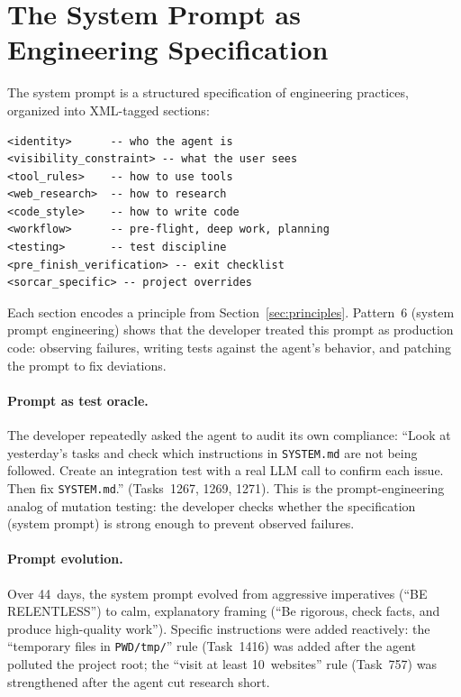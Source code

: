 \documentclass{article}
\begin{document}
\section{The System Prompt as Engineering Specification}
\label{sec:system-prompt}

The system prompt is a structured specification of engineering
practices, organized into XML-tagged sections:

\begin{lstlisting}[style=prompt]
<identity>      -- who the agent is
<visibility_constraint> -- what the user sees
<tool_rules>    -- how to use tools
<web_research>  -- how to research
<code_style>    -- how to write code
<workflow>      -- pre-flight, deep work, planning
<testing>       -- test discipline
<pre_finish_verification> -- exit checklist
<sorcar_specific> -- project overrides
\end{lstlisting}

Each section encodes a principle from Section~\ref{sec:principles}.
Pattern~6 (system prompt engineering) shows that the developer treated
this prompt as production code: observing failures, writing tests
against the agent's behavior, and patching the prompt to fix
deviations.

\paragraph{Prompt as test oracle.}
The developer repeatedly asked the agent to audit its own compliance:
``Look at yesterday's tasks and check which instructions in
\texttt{SYSTEM.md} are not being followed.  Create an integration
test with a real LLM call to confirm each issue.  Then fix
\texttt{SYSTEM.md}.'' (Tasks~1267, 1269, 1271).
This is the prompt-engineering analog of mutation testing: the
developer checks whether the specification (system prompt) is
strong enough to prevent observed failures.

\paragraph{Prompt evolution.}
Over 44~days, the system prompt evolved from aggressive imperatives
(``BE RELENTLESS'') to calm, explanatory framing (``Be rigorous,
check facts, and produce high-quality work'').
Specific instructions were added reactively: the ``temporary files
in \texttt{PWD/tmp/}'' rule (Task~1416) was added after the agent
polluted the project root; the ``visit at least 10~websites'' rule
(Task~757) was strengthened after the agent cut research short.
\end{document}
